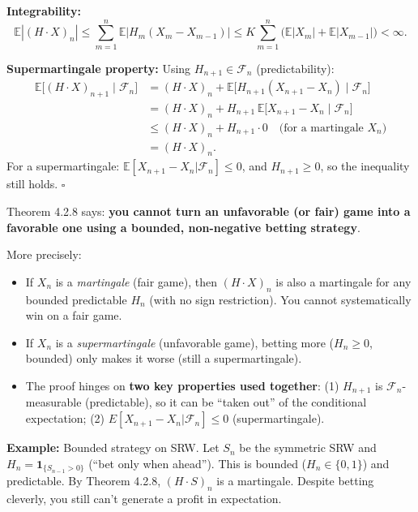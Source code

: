 \documentclass[12pt]{article}
\newcommand{\E}{\mathbb{E}}
\newcommand{\F}{\mathcal{F}}
\newcommand{\1}{\mathbf{1}}
\begin{document}
\begin{tcolorbox}[redbox={Proof of Theorem 4.2.8}]
\textbf{Integrability:}
\[
  \E|(H \cdot X)_n|
  \le \sum_{m=1}^n \E|H_m(X_m - X_{m-1})|
  \le K \sum_{m=1}^n \bigl(\E|X_m| + \E|X_{m-1}|\bigr) < \infty.
\]

\textbf{Supermartingale property:}  Using $H_{n+1} \in \F_n$ (predictability):
\begin{align*}
  \E\bigl[(H \cdot X)_{n+1} \mid \F_n\bigr]
  &= (H \cdot X)_n + \E\bigl[H_{n+1}(X_{n+1} - X_n) \mid \F_n\bigr] \\
  &= (H \cdot X)_n + H_{n+1}\,\E\bigl[X_{n+1} - X_n \mid \F_n\bigr] \\
  &\le (H \cdot X)_n + H_{n+1} \cdot 0 \quad \text{(for a martingale $X_n$)} \\
  &= (H \cdot X)_n.
\end{align*}
For a supermartingale: $\E[X_{n+1} - X_n|\F_n] \le 0$, and $H_{n+1} \ge 0$, so the
inequality still holds.  \hfill$\square$
\end{tcolorbox}

\begin{tcolorbox}[bluebox={Intuition and Key Consequence}]
Theorem 4.2.8 says: \textbf{you cannot turn an unfavorable (or fair) game into a
favorable one using a bounded, non-negative betting strategy}.

\medskip
More precisely:
\begin{itemize}
  \item If $X_n$ is a \emph{martingale} (fair game), then $(H \cdot X)_n$ is also a
        martingale for any bounded predictable $H_n$ (with no sign restriction).
        You cannot systematically win on a fair game.
  \item If $X_n$ is a \emph{supermartingale} (unfavorable game), betting more
        ($H_n \ge 0$, bounded) only makes it worse (still a supermartingale).

  \item The proof hinges on \textbf{two key properties used together}:
        (1) $H_{n+1}$ is $\F_n$-measurable (predictable), so it can be ``taken out''
        of the conditional expectation; (2) $E[X_{n+1}-X_n|\F_n] \le 0$ (supermartingale).
\end{itemize}

\medskip
\textbf{Example:} Bounded strategy on SRW.
Let $S_n$ be the symmetric SRW and $H_n = \1_{\{S_{n-1} > 0\}}$ (``bet only when ahead'').
This is bounded ($H_n \in \{0,1\}$) and predictable. By Theorem 4.2.8, $(H \cdot S)_n$
is a martingale.  Despite betting cleverly, you still can't generate a profit in
expectation.
\end{tcolorbox}
\end{document}
